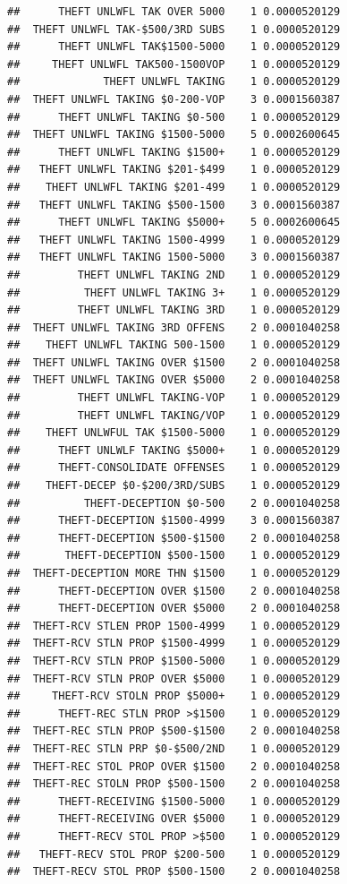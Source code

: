 \documentclass[]{book}
\begin{document}
\begin{verbatim}
##      THEFT UNLWFL TAK OVER 5000    1 0.0000520129
##  THEFT UNLWFL TAK-$500/3RD SUBS    1 0.0000520129
##      THEFT UNLWFL TAK$1500-5000    1 0.0000520129
##     THEFT UNLWFL TAK500-1500VOP    1 0.0000520129
##             THEFT UNLWFL TAKING    1 0.0000520129
##  THEFT UNLWFL TAKING $0-200-VOP    3 0.0001560387
##      THEFT UNLWFL TAKING $0-500    1 0.0000520129
##  THEFT UNLWFL TAKING $1500-5000    5 0.0002600645
##      THEFT UNLWFL TAKING $1500+    1 0.0000520129
##   THEFT UNLWFL TAKING $201-$499    1 0.0000520129
##    THEFT UNLWFL TAKING $201-499    1 0.0000520129
##   THEFT UNLWFL TAKING $500-1500    3 0.0001560387
##      THEFT UNLWFL TAKING $5000+    5 0.0002600645
##   THEFT UNLWFL TAKING 1500-4999    1 0.0000520129
##   THEFT UNLWFL TAKING 1500-5000    3 0.0001560387
##         THEFT UNLWFL TAKING 2ND    1 0.0000520129
##          THEFT UNLWFL TAKING 3+    1 0.0000520129
##         THEFT UNLWFL TAKING 3RD    1 0.0000520129
##  THEFT UNLWFL TAKING 3RD OFFENS    2 0.0001040258
##    THEFT UNLWFL TAKING 500-1500    1 0.0000520129
##  THEFT UNLWFL TAKING OVER $1500    2 0.0001040258
##  THEFT UNLWFL TAKING OVER $5000    2 0.0001040258
##         THEFT UNLWFL TAKING-VOP    1 0.0000520129
##         THEFT UNLWFL TAKING/VOP    1 0.0000520129
##    THEFT UNLWFUL TAK $1500-5000    1 0.0000520129
##      THEFT UNLWLF TAKING $5000+    1 0.0000520129
##      THEFT-CONSOLIDATE OFFENSES    1 0.0000520129
##    THEFT-DECEP $0-$200/3RD/SUBS    1 0.0000520129
##          THEFT-DECEPTION $0-500    2 0.0001040258
##      THEFT-DECEPTION $1500-4999    3 0.0001560387
##      THEFT-DECEPTION $500-$1500    2 0.0001040258
##       THEFT-DECEPTION $500-1500    1 0.0000520129
##  THEFT-DECEPTION MORE THN $1500    1 0.0000520129
##      THEFT-DECEPTION OVER $1500    2 0.0001040258
##      THEFT-DECEPTION OVER $5000    2 0.0001040258
##  THEFT-RCV STLEN PROP 1500-4999    1 0.0000520129
##  THEFT-RCV STLN PROP $1500-4999    1 0.0000520129
##  THEFT-RCV STLN PROP $1500-5000    1 0.0000520129
##  THEFT-RCV STLN PROP OVER $5000    1 0.0000520129
##     THEFT-RCV STOLN PROP $5000+    1 0.0000520129
##      THEFT-REC STLN PROP >$1500    1 0.0000520129
##  THEFT-REC STLN PROP $500-$1500    2 0.0001040258
##  THEFT-REC STLN PRP $0-$500/2ND    1 0.0000520129
##  THEFT-REC STOL PROP OVER $1500    2 0.0001040258
##  THEFT-REC STOLN PROP $500-1500    2 0.0001040258
##      THEFT-RECEIVING $1500-5000    1 0.0000520129
##      THEFT-RECEIVING OVER $5000    1 0.0000520129
##      THEFT-RECV STOL PROP >$500    1 0.0000520129
##   THEFT-RECV STOL PROP $200-500    1 0.0000520129
##  THEFT-RECV STOL PROP $500-1500    2 0.0001040258

\end{verbatim}
\end{document}
